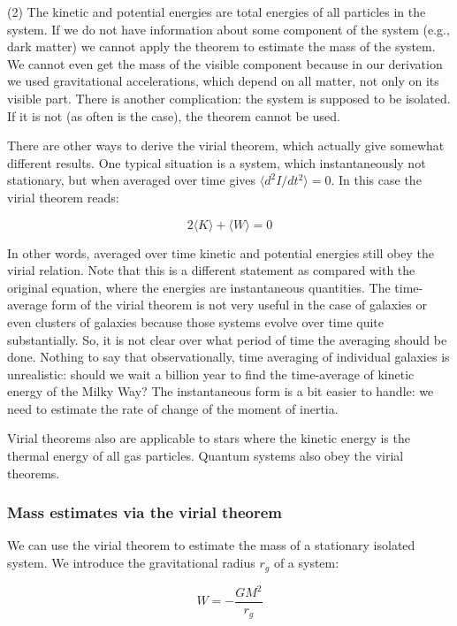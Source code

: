 (2) The kinetic and potential energies are total energies of all particles in the system. If we do not have information about some component of the system (e.g., dark matter) we cannot apply the theorem to estimate the mass of the system. We cannot even get the mass of the visible component because in our derivation we used gravitational accelerations, which depend on all matter, not only on its visible part. There is another complication: the system is supposed to be isolated. If it is not (as often is the case), the theorem cannot be used.

There are other ways to derive the virial theorem, which actually give somewhat different results. One typical situation is a system, which instantaneously not stationary, but when averaged over time gives $\langle d^2I/dt^2\rangle = 0$. In this case the virial theorem reads:

\begin{equation}
2\langle K\rangle + \langle W\rangle = 0
\end{equation}

In other words, averaged over time kinetic and potential energies still obey the virial relation. Note that this is a different statement as compared with the original equation, where the energies are instantaneous quantities. The time-average form of the virial theorem is not very useful in the case of galaxies or even clusters of galaxies because those systems evolve over time quite substantially. So, it is not clear over what period of time the averaging should be done. Nothing to say that observationally, time averaging of individual galaxies is unrealistic: should we wait a billion year to find the time-average of kinetic energy of the Milky Way? The instantaneous form is a bit easier to handle: we need to estimate the rate of change of the moment of inertia.

Virial theorems also are applicable to stars where the kinetic energy is the thermal energy of all gas particles. Quantum systems also obey the virial theorems.

\subsubsection{Mass estimates via the virial theorem}

We can use the virial theorem to estimate the mass of a stationary isolated system. We introduce the gravitational radius $r_g$ of a system:

\begin{equation}
W = -\frac{GM^2}{r_g}
\end{equation}

